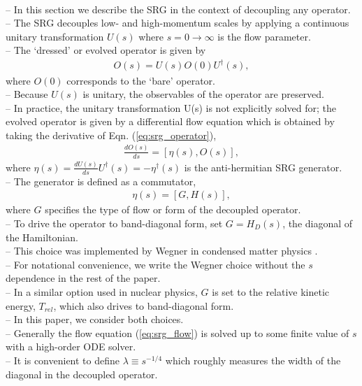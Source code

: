 \documentclass[preprintnumbers,floatfix,aps,prc,preprint,nofootinbib]{revtex4-1}
\begin{document}
\\
-- In this section we describe the SRG in the context of decoupling any operator.
\\
-- The SRG decouples low- and high-momentum scales by applying a continuous unitary transformation $U(s)$ where $s=0 \rightarrow \infty$ is the flow parameter.
\\
-- The `dressed' or evolved operator is given by
%
\begin{eqnarray}
  \label{eq:srg_operator}
  O(s) = U(s) O(0) U^{\dagger}(s),
\end{eqnarray}
%
where $O(0)$ corresponds to the `bare' operator.
\\
-- Because $U(s)$ is unitary, the observables of the operator are preserved.
\\
-- In practice, the unitary transformation U(s) is not explicitly solved for; the evolved operator is given by a differential flow equation which is obtained by taking the derivative of Eqn. (\ref{eq:srg_operator}),
%
\begin{eqnarray}
  \label{eq:srg_flow}
  \frac{dO(s)}{ds} = [\eta(s), O(s)],
\end{eqnarray}
%
where $\eta(s)=\frac{dU(s)}{ds} U^{\dagger}(s) = -\eta^{\dagger}(s)$ is the anti-hermitian SRG generator.
\\
-- The generator is defined as a commutator,
%
\begin{eqnarray}
  \label{eq:srg_generator}
  \eta(s) = [G, H(s)],
\end{eqnarray}
%
where $G$ specifies the type of flow or form of the decoupled operator.
\\
-- To drive the operator to band-diagonal form, set $G=H_D(s)$, the diagonal of the Hamiltonian.
\\
-- This choice was implemented by Wegner in condensed matter physics \cite{Wegner:1994ab}.
\\
-- For notational convenience, we write the Wegner choice without the $s$ dependence in the rest of the paper.
\\
-- In a similar option used in nuclear physics, $G$ is set to the relative kinetic energy, $T_{rel}$, which also drives to band-diagonal form.
\\
-- In this paper, we consider both choices.
\\
-- Generally the flow equation (\ref{eq:srg_flow}) is solved up to some finite value of $s$ with a high-order ODE solver.
\\
-- It is convenient to define $\lambda \equiv s^{-1/4}$ which roughly measures the width of the diagonal in the decoupled operator.
\\
\end{document}
